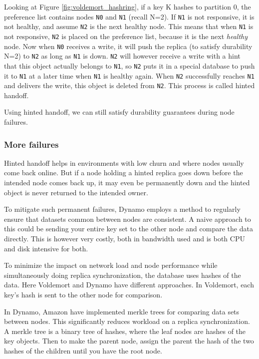 Looking at Figure \ref{fig:voldemort_hashring}, if a key K hashes to partition 0, the preference list contains nodes \texttt{N0} and \texttt{N1} (recall N=2).
If \texttt{N1} is not responsive, it is not healthy, and assume \texttt{N2} is the next healthy node.
This means that when \texttt{N1} is not responsive, \texttt{N2} is placed on the preference list, because it is the next \emph{healthy} node.
Now when \texttt{N0} receives a write, it will push the replica (to satisfy durability N=2) to \texttt{N2} as long as \texttt{N1} is down.
\texttt{N2} will however receive a write with a hint that this object actually belongs to \texttt{N1}, so \texttt{N2} puts it in a special database to push it to \texttt{N1} at a later time when \texttt{N1} is healthy again. When \texttt{N2} successfully reaches \texttt{N1} and delivers the write, this object is deleted from \texttt{N2}.
This process is called hinted handoff. 

Using hinted handoff, we can still satisfy durability guarantees during node failures.

\subsubsection{More failures}
Hinted handoff helps in environments with low churn and where nodes usually come back online. But if a node holding a hinted replica goes down before the intended node comes back up, it may even be permanently down and the hinted object is never returned to the intended owner.

To mitigate such permanent failures, Dynamo\cite{dynamo} employs a method to regularly ensure that datasets common between nodes are consistent. A naive approach to this could be sending your entire key set to the other node and compare the data directly.
This is however very costly, both in bandwidth used and is both CPU and disk intensive for both.

To minimize the impact on network load and node performance while simultaneously doing replica synchronization, the database uses hashes of the data. Here Voldemort and Dynamo have different approaches. In Voldemort, each key's hash is sent to the other node for comparison.

In Dynamo, Amazon have implemented merkle trees for comparing data sets between nodes. This significantly reduces workload on a replica synchronization.
A merkle tree is a binary tree of hashes, where the leaf nodes are hashes of the key objects.
Then to make the parent node, assign the parent the hash of the two hashes of the children until you have the root node. 

